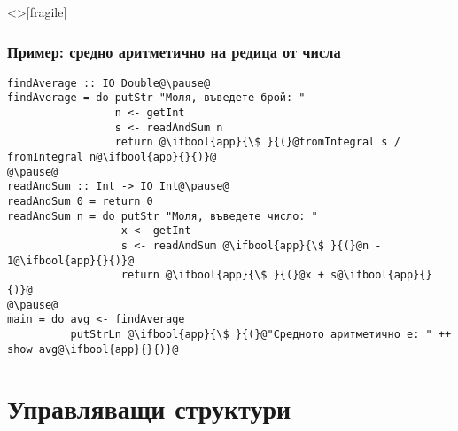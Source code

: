 \documentclass[alsotrans,beameroptions={aspectratio=169}]{beamerswitch}
\begin{document}
\begin{frame}<>[fragile]
  \frametitle{Пример: средно аритметично на редица от числа}
\lstsmall
\begin{lstlisting}
findAverage :: IO Double@\pause@
findAverage = do putStr "Моля, въведете брой: "
                 n <- getInt
                 s <- readAndSum n
                 return @\ifbool{app}{\$ }{(}@fromIntegral s / fromIntegral n@\ifbool{app}{}{)}@
@\pause@
readAndSum :: Int -> IO Int@\pause@
readAndSum 0 = return 0
readAndSum n = do putStr "Моля, въведете число: "
                  x <- getInt
                  s <- readAndSum @\ifbool{app}{\$ }{(}@n - 1@\ifbool{app}{}{)}@
                  return @\ifbool{app}{\$ }{(}@x + s@\ifbool{app}{}{)}@
@\pause@
main = do avg <- findAverage
          putStrLn @\ifbool{app}{\$ }{(}@"Средното аритметично е: " ++ show avg@\ifbool{app}{}{)}@
\end{lstlisting}
\end{frame}

\section{Управляващи структури}
\end{document}
